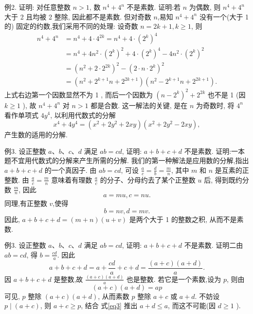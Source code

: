 例2. 证明: 对任意整数 $n>1$, 数 $n^4+4^n$ 不是素数.
证明:若 $n$ 为偶数, 则 $n^4+4^n$ 大于 2 且均被 2 整除, 因此都不是素数.
但对奇数 $n$,易知 $n^4+4^n$ 没有一个(大于 1 的) 固定的约数,我们采用不同的处理:
设奇数 $n=2 k+1, k \geqslant 1$, 则
$$
\begin{aligned}
n^4+4^n & =n^4+4 \cdot 4^{2 k}=n^4+4 \cdot\left(2^k\right)^4 \\
& =n^4+4 n^2 \cdot\left(2^k\right)^2+4 \cdot\left(2^k\right)^4-4 n^2 \cdot\left(2^k\right)^2 \\
& =\left(n^2+2 \cdot 2^{2 k}\right)^2-\left(2 \cdot n \cdot 2^k\right)^2 \\
& =\left(n^2+2^{k+1} n+2^{2 k+1}\right)\left(n^2-2^{k+1} n+2^{2 k+1}\right) .
\end{aligned}
$$
上式右边第一个因数显然不为 1 , 而后一个因数为 $\left(n-2^k\right)^2+2^{2 k}$ 也不是 1 (因 $k \geqslant 1$ ), 故 $n^4+4^n$ 对 $n>1$ 都是合数.
这一解法的关键, 是在 $n$ 为奇数时, 将 $4^n$ 看作单项式 $4 y^4$, 以利用代数式的分解
$$
x^4+4 y^4=\left(x^2+2 y^2+2 x y\right)\left(x^2+2 y^2-2 x y\right),
$$
产生数的适用的分解.



例3. 设正整数 $a 、 b 、 c 、 d$ 满足 $a b=c d$, 证明: $a+b+c+d$ 不是素数.
证明:一本题不宜用代数式的分解来产生所需的分解.
我们的第一种解法是应用数的分解,指出 $a+b+c+d$ 的一个真因子.
由 $a b=c d$, 可设 $\frac{a}{c}=\frac{d}{b}=\frac{m}{n}$, 其中 $m$ 和 $n$ 是互素的正整数.
由 $\frac{a}{c}=\frac{m}{n}$ 意味着有理数 $\frac{a}{c}$ 的分子、分母约去了某个正整数 $u$ 后, 得到既约分数 $\frac{m}{n}$, 因此
$$
a=m u, c=n u . \label{eq1}
$$
同理,有正整数 $v$,使得
$$
b=n v, d=m v . \label{eq2}
$$
因此, $a+b+c+d=(m+n)(u+v)$ 是两个大于 1 的整数之积, 从而不是素数.



例3. 设正整数 $a 、 b 、 c 、 d$ 满足 $a b=c d$, 证明: $a+b+c+d$ 不是素数.
证明二由 $a b=c d$, 得 $b=\frac{c d}{a}$. 因此
$$
a+b+c+d=a+\frac{c d}{a}+c+d=\frac{(a+c)(a+d)}{a} .
$$
因 $a+b+c+d$ 是整数,故 $\frac{(a+c)(a+d)}{a}$ 也是整数.
若它是一个素数,设为 $p$, 则由
$$
(a+c)(a+d)=a p \label{eq3}
$$
可见, $p$ 整除 $(a+c)(a+d)$, 从而素数 $p$ 整除 $a+c$ 或 $a+d$. 不妨设 $p \mid(a+c)$, 则 $a+c \geqslant p$, 结合 式\ref{eq3} 推出 $a+d \leqslant a$, 而这不可能(因 $d \geqslant 1$ ).



